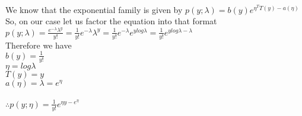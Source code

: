 \begin{answer}\\
We know that the exponential family is given by $p(y;\lambda)=b(y)e^{\eta^T T(y)-a(\eta)}$\\
So, on our case let us factor the equation into that format\\
$p(y;\lambda)=\frac{e^{-\lambda}\lambda^y}{y!}=\frac{1}{y!}e^{-\lambda}\lambda^y=\frac{1}{y!}e^{-\lambda}e^{y log \lambda}=\frac{1}{y!}e^{y log \lambda-\lambda}$\\
Therefore we have\\
$b(y)=\frac{1}{y!}$\\
$\eta=log \lambda$\\
$T(y)=y$\\
$a(\eta)=\lambda=e^{\eta}$\\
\\
$\therefore p(y;\eta)=\frac{1}{y!}e^{\eta y -e^{\eta}}$\\
\end{answer}
